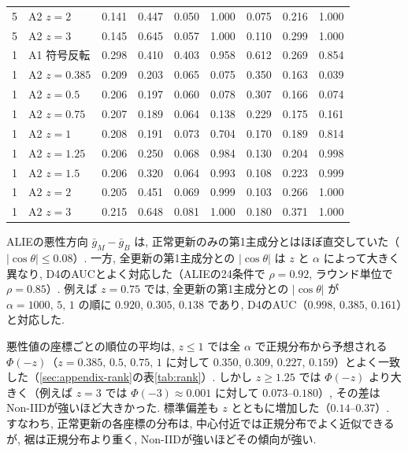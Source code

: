 \documentclass[a4j, twocolumn, dvipdfmx]{jsarticle}
\begin{document}
\begin{table}[t]
\begin{tabular}{@{}llccccccc@{}}
5 & A2 $z{=}2$ & 0.141 & 0.447 & 0.050 & 1.000 & 0.075 & 0.216 & 1.000 \\
5 & A2 $z{=}3$ & 0.145 & 0.645 & 0.057 & 1.000 & 0.110 & 0.299 & 1.000 \\
\midrule
1 & A1 符号反転 & 0.298 & 0.410 & 0.403 & 0.958 & 0.612 & 0.269 & 0.854 \\
1 & A2 $z{=}0.385$ & 0.209 & 0.203 & 0.065 & 0.075 & 0.350 & 0.163 & 0.039 \\
1 & A2 $z{=}0.5$ & 0.206 & 0.197 & 0.060 & 0.078 & 0.307 & 0.166 & 0.074 \\
1 & A2 $z{=}0.75$ & 0.207 & 0.189 & 0.064 & 0.138 & 0.229 & 0.175 & 0.161 \\
1 & A2 $z{=}1$ & 0.208 & 0.191 & 0.073 & 0.704 & 0.170 & 0.189 & 0.814 \\
1 & A2 $z{=}1.25$ & 0.206 & 0.250 & 0.068 & 0.984 & 0.130 & 0.204 & 0.998 \\
1 & A2 $z{=}1.5$ & 0.206 & 0.320 & 0.064 & 0.993 & 0.108 & 0.223 & 0.999 \\
1 & A2 $z{=}2$ & 0.205 & 0.451 & 0.069 & 0.999 & 0.103 & 0.266 & 1.000 \\
1 & A2 $z{=}3$ & 0.215 & 0.648 & 0.081 & 1.000 & 0.180 & 0.371 & 1.000 \\
\bottomrule
\end{tabular}
\end{table}

ALIEの悪性方向 $\bar{g}_M - \bar{g}_B$ は, 正常更新のみの第1主成分とはほぼ直交していた（$|\cos\theta| \le 0.08$）. 一方, 全更新の第1主成分との $|\cos\theta|$ は $z$ と $\alpha$ によって大きく異なり, D4のAUCとよく対応した（ALIEの24条件で $\rho=0.92$, ラウンド単位で $\rho=0.85$）. 例えば $z=0.75$ では, 全更新の第1主成分との $|\cos\theta|$ が $\alpha=1000,\,5,\,1$ の順に $0.920$, $0.305$, $0.138$ であり, D4のAUC（$0.998$, $0.385$, $0.161$）と対応した.

悪性値の座標ごとの順位の平均は, $z \le 1$ では全 $\alpha$ で正規分布から予想される $\Phi(-z)$（$z=0.385,\,0.5,\,0.75,\,1$ に対して $0.350$, $0.309$, $0.227$, $0.159$）とよく一致した（\ref{sec:appendix-rank}の表\ref{tab:rank}）. しかし $z \ge 1.25$ では $\Phi(-z)$ より大きく（例えば $z=3$ では $\Phi(-3) \approx 0.001$ に対して $0.073$--$0.180$）, その差はNon-IIDが強いほど大きかった. 標準偏差も $z$ とともに増加した（$0.14$--$0.37$）. すなわち, 正常更新の各座標の分布は, 中心付近では正規分布でよく近似できるが, 裾は正規分布より重く, Non-IIDが強いほどその傾向が強い.

\end{document}
